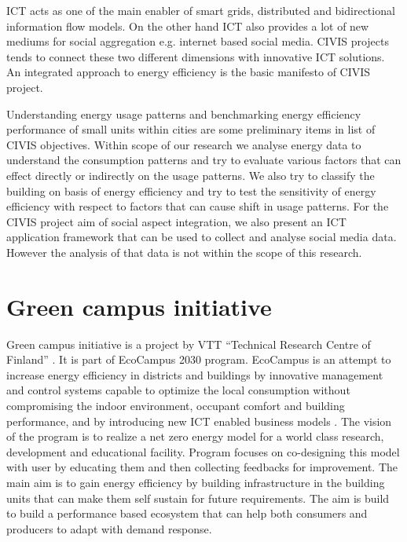 ICT acts as one of the main enabler of smart grids,  distributed  and bidirectional information flow models. On the other hand ICT also provides a lot of new mediums for social aggregation e.g. internet based social media. CIVIS projects tends to connect these two different dimensions with innovative ICT solutions. An integrated approach to energy efficiency is the basic manifesto of CIVIS project. \cite{civisproposal}

Understanding energy usage patterns and benchmarking energy efficiency performance of small units within cities are some preliminary items in list of CIVIS objectives. Within scope of our research we analyse energy data to understand the consumption patterns and try to evaluate various factors that can effect directly or indirectly on the usage patterns. We also try to classify the building on basis of energy efficiency and try to test the sensitivity of energy efficiency with respect to factors that can cause shift in usage patterns. For the CIVIS project aim of social aspect integration, we also present an ICT application framework that can be used to collect and analyse social media data. However the analysis of that data is not within the scope of this research. 


\section{Green campus initiative} \label{greencamp}

Green campus initiative is a project by VTT  ``Technical Research Centre of Finland'' . It is part of EcoCampus 2030 program. EcoCampus is an attempt to increase energy efficiency in districts and buildings by innovative management and control systems capable to optimize the local consumption without compromising the indoor environment, occupant comfort and building performance, and by introducing new ICT enabled business models \cite{ greencampus}. The vision of the program is to realize a net zero energy model for a world class research, development and educational facility. Program focuses on co-designing this model with user by educating them and then collecting feedbacks for improvement. The main aim is to gain energy efficiency by building infrastructure in the building units that can make them self sustain for future requirements. The aim is build to build a performance based ecosystem that can help both consumers and producers to adapt with demand response.

